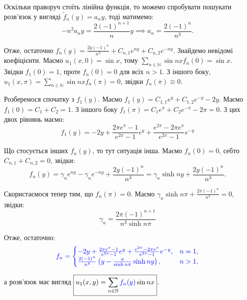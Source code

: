 \documentclass{hw_template}
\begin{document}
Оскільки праворуч стоїть лінійна функція, то можемо спробувати пошукати розв'язок у вигляді $\widetilde{f}_n(y) = a_ny$, 
тоді матимемо:
\begin{equation*}
    -n^2a_ny = \frac{2(-1)^{n+1}}{n}y \implies a_n = \frac{2(-1)^{n}}{n^3}.
\end{equation*}

Отже, остаточно $f_n(y) = \frac{2y(-1)^n}{n^3} + C_{n,1}e^{ny} + C_{n,2}e^{-ny}$. Знайдемо невідомі коефіцієнти. 
Маємо $u_1(x,0) = \sin x$, тому $\sum_{n \in \mathbb{N}}\sin nx f_n(0) = \sin x$. Звідки $f_1(0)=1$, проте $f_n(0)=0$ для 
всіх $n>1$. З іншого боку, $u_1(x,\pi)=\sum_{n \in \mathbb{N}} \sin nx f_n(\pi) = 0$, звідки $f_n(\pi) \equiv 0$. 

Розберемося спочатку з $f_1(y)$. Маємо $f_1(y) = C_{1,1}e^y + C_{1,2}e^{-y} - 2y$. Маємо $f_1(0)=C_1+C_2=1$. 
З іншого боку $f_1(\pi) = C_1e^{\pi}+C_2e^{-\pi} - 2\pi = 0$. З цих двох рівнянь маємо:
\begin{equation*}
    f_1(y) = -2y + \frac{2\pi e^{\pi} - 1}{e^{2\pi}-1}e^{y} + \frac{e^{2\pi}-2\pi e^{\pi}}{e^{2\pi}-1}e^{-y}
\end{equation*}

Що стосується інших $f_n(y)$, то тут ситуація інша. Маємо $f_n(0)=0$, себто $C_{n,1}+C_{n,2}=0$, звідки:
\begin{equation*}
    f_n(y) = \gamma_n e^{ny} - \gamma_n e^{-ny} + \frac{2y(-1)^n}{n^3} = \gamma_n \sinh ny + \frac{2y(-1)^n}{n^3}.
\end{equation*}

Скористаємося тепер тим, що $f_n(\pi)=0$. Маємо $\gamma_n \sinh n\pi + \frac{2\pi (-1)^n}{n^3} = 0$, звідки:
\begin{equation*}
    \gamma_n = \frac{2\pi(-1)^{n+1}}{n^3 \sinh n\pi}
\end{equation*}

Отже, остаточно:
\begin{equation*}
    \textcolor{blue}{f_n = \begin{cases}
        -2y + \frac{2\pi e^{\pi} - 1}{e^{2\pi}-1}e^{y} + \frac{e^{2\pi}-2\pi e^{\pi}}{e^{2\pi}-1}e^{-y}, & n=1, \\
        \frac{2(-1)^n}{n^3}\left(y - \frac{\pi}{\sinh n\pi} \sinh ny\right), & n>1,
    \end{cases}}
\end{equation*}

а розв'язок має вигляд $\boxed{u_1(x,y) = \sum_{n \in \mathbb{N}} \textcolor{blue}{f_n(y)} \sin nx}$. 
\end{document}
